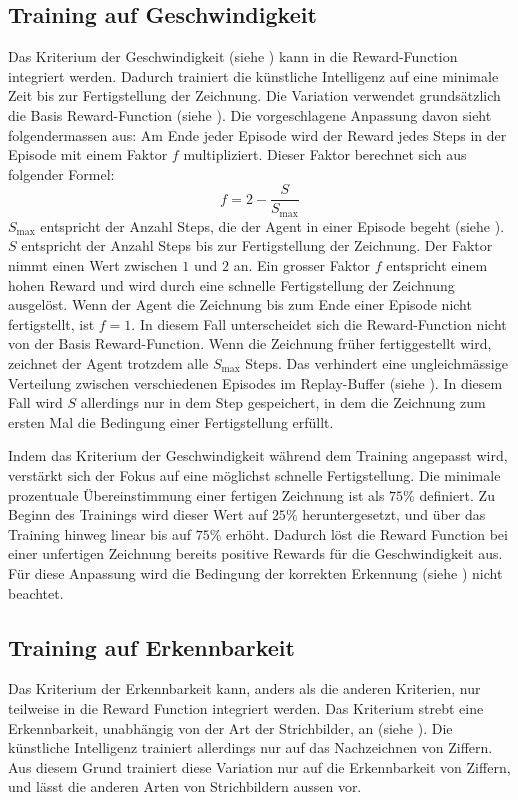 \subsection{Training auf Geschwindigkeit}\label{sub:m_var_speed}
Das Kriterium der Geschwindigkeit (siehe ) kann in
die Reward-Function integriert werden. Dadurch trainiert die künstliche
Intelligenz auf eine minimale Zeit bis zur Fertigstellung der Zeichnung. Die
Variation verwendet grundsätzlich die Basis Reward-Function (siehe
). Die vorgeschlagene Anpassung davon sieht
folgendermassen aus: Am Ende jeder Episode wird der Reward jedes Steps in der
Episode mit einem Faktor $f$ multipliziert. Dieser Faktor berechnet sich aus
folgender Formel:
\[ f = 2 - \frac{S}{S_{\max}} \]
$S_{\max}$ entspricht der Anzahl Steps, die der Agent in einer Episode begeht
(siehe ). $S$ entspricht der Anzahl Steps bis zur
Fertigstellung der Zeichnung. Der Faktor nimmt einen Wert zwischen $1$ und $2$
an. Ein grosser Faktor $f$ entspricht einem hohen Reward und wird durch eine
schnelle Fertigstellung der Zeichnung ausgelöst. Wenn der Agent die Zeichnung
bis zum Ende einer Episode nicht fertigstellt, ist $f = 1$. In diesem Fall unterscheidet sich die
Reward-Function nicht von der Basis Reward-Function. Wenn die Zeichnung früher
fertiggestellt wird, zeichnet der Agent trotzdem alle $S_{\max}$ Steps. Das
verhindert eine ungleichmässige Verteilung zwischen verschiedenen Episodes im
Replay-Buffer (siehe ). In diesem Fall wird $S$
allerdings nur in dem Step gespeichert, in dem die Zeichnung zum ersten Mal die
Bedingung einer Fertigstellung erfüllt.  
 
Indem das Kriterium der Geschwindigkeit während dem Training angepasst wird,
verstärkt sich der Fokus auf eine möglichst schnelle Fertigstellung. Die
minimale prozentuale Übereinstimmung einer fertigen Zeichnung ist als $75\%$
definiert. Zu Beginn des Trainings wird dieser Wert auf $25\%$ heruntergesetzt,
und über das Training hinweg linear bis auf $75\%$ erhöht. Dadurch löst die
Reward Function bei einer unfertigen Zeichnung bereits positive Rewards für die
Geschwindigkeit aus. Für diese Anpassung wird die Bedingung der korrekten
Erkennung (siehe ) nicht beachtet.
 
 
\subsection{Training auf Erkennbarkeit}\label{sub:m_var_rec}
Das Kriterium der Erkennbarkeit kann, anders als die anderen Kriterien, nur
teilweise in die Reward Function integriert werden. Das Kriterium strebt eine
Erkennbarkeit, unabhängig von der Art der Strichbilder, an (siehe
). Die künstliche Intelligenz trainiert allerdings nur
auf das Nachzeichnen von Ziffern. Aus diesem Grund trainiert diese Variation nur
auf die Erkennbarkeit von Ziffern, und lässt die anderen Arten von Strichbildern
aussen vor.
 
